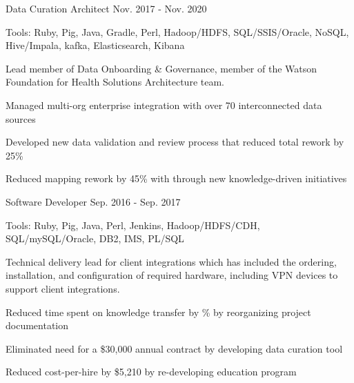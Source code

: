 \begin{cventries}
  \cvexpsubposition
    {Data Curation Architect} %
    {Nov. 2017 - Nov. 2020} %
    {}
    {
      \begin{cvheavyparagraph}
        Tools: Ruby, Pig, Java, Gradle, Perl, Hadoop/HDFS, SQL/SSIS/Oracle, NoSQL, Hive/Impala, kafka, Elasticsearch, Kibana
      \end{cvheavyparagraph}
    }
    {
      \begin{cvparagraph}
        Lead member of Data Onboarding \& Governance, member of the Watson Foundation for Health Solutions Architecture team. 
      \end{cvparagraph}
      \begin{cvitems} %
        \item {Managed multi-org enterprise integration with over 70 interconnected data sources}
        \item {Developed new data validation and review process that reduced total rework by 25\%}
        \item {Reduced mapping rework by 45\% with through new knowledge-driven initiatives}
      \end{cvitems}
    }

  \cvexpsubposition
    {Software Developer} %
    {Sep. 2016 - Sep. 2017} %
    {}
    {
      \begin{cvheavyparagraph}
        Tools: Ruby, Pig, Java, Perl, Jenkins, Hadoop/HDFS/CDH, SQL/mySQL/Oracle, DB2, IMS, PL/SQL
      \end{cvheavyparagraph}
    }
    {
      \begin{cvparagraph}
        Technical delivery lead for client integrations which has included the ordering, installation, and configuration of required hardware, including VPN devices to support client integrations.
      \end{cvparagraph}
      \begin{cvitems} %
        \item {Reduced time spent on knowledge transfer by \% by reorganizing project documentation}
        \item {Eliminated need for a \$30,000 annual contract by developing data curation tool}
        \item {Reduced cost-per-hire by \$5,210 by re-developing education program}
      \end{cvitems}
    }


\end{cventries}
